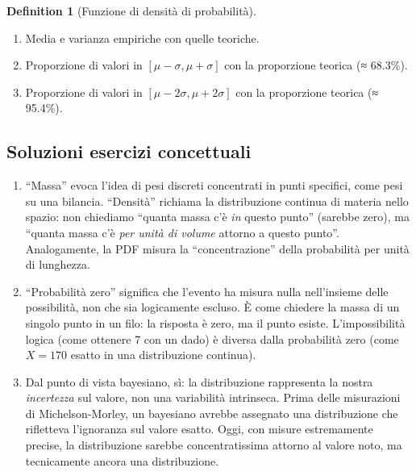 \documentclass[
  letterpaper,
  DIV=11,
  numbers=noendperiod,
  oneside]{scrreprt}
\providecommand{\tightlist}{%
  \setlength{\itemsep}{0pt}\setlength{\parskip}{0pt}}
\theoremstyle{definition}
\theoremstyle{plain}
\theoremstyle{definition}
\newtheorem{definition}{Definition}[chapter]
\theoremstyle{remark}
\begin{document}
\begin{definition}[Funzione di densità di
probabilità]
\begin{tcolorbox}
\begin{enumerate}
  \begin{enumerate}
  \def\labelenumii{\alph{enumii}.}
  \tightlist
  \item
    Media e varianza empiriche con quelle teoriche.
  \item
    Proporzione di valori in \([\mu - \sigma, \mu + \sigma]\) con la
    proporzione teorica (≈ 68.3\%).
  \item
    Proporzione di valori in \([\mu - 2\sigma, \mu + 2\sigma]\) con la
    proporzione teorica (≈ 95.4\%).
  \end{enumerate}
\end{enumerate}

\end{tcolorbox}

\begin{tcolorbox}[enhanced jigsaw, arc=.35mm, breakable, colbacktitle=quarto-callout-tip-color!10!white, opacityback=0, toprule=.15mm, rightrule=.15mm, colback=white, opacitybacktitle=0.6, leftrule=.75mm, coltitle=black, bottomtitle=1mm, left=2mm, toptitle=1mm, title=\textcolor{quarto-callout-tip-color}{\faLightbulb}\hspace{0.5em}{Soluzioni}, titlerule=0mm, bottomrule=.15mm, colframe=quarto-callout-tip-color-frame]

\subsection*{Soluzioni esercizi
concettuali}\label{soluzioni-esercizi-concettuali-1}

\begin{enumerate}
\def\labelenumi{\arabic{enumi}.}
\item
  ``Massa'' evoca l'idea di pesi discreti concentrati in punti
  specifici, come pesi su una bilancia. ``Densità'' richiama la
  distribuzione continua di materia nello spazio: non chiediamo ``quanta
  massa c'è \emph{in} questo punto'' (sarebbe zero), ma ``quanta massa
  c'è \emph{per unità di volume} attorno a questo punto''. Analogamente,
  la PDF misura la ``concentrazione'' della probabilità per unità di
  lunghezza.
\item
  ``Probabilità zero'' significa che l'evento ha misura nulla
  nell'insieme delle possibilità, non che sia logicamente escluso. È
  come chiedere la massa di un singolo punto in un filo: la risposta è
  zero, ma il punto esiste. L'impossibilità logica (come ottenere 7 con
  un dado) è diversa dalla probabilità zero (come \(X = 170\) esatto in
  una distribuzione continua).
\item
  Dal punto di vista bayesiano, sì: la distribuzione rappresenta la
  nostra \emph{incertezza} sul valore, non una variabilità intrinseca.
  Prima delle misurazioni di Michelson-Morley, un bayesiano avrebbe
  assegnato una distribuzione che rifletteva l'ignoranza sul valore
  esatto. Oggi, con misure estremamente precise, la distribuzione
  sarebbe concentratissima attorno al valore noto, ma tecnicamente
  ancora una distribuzione.
\end{enumerate}


\end{tcolorbox}
\end{definition}
\end{document}
